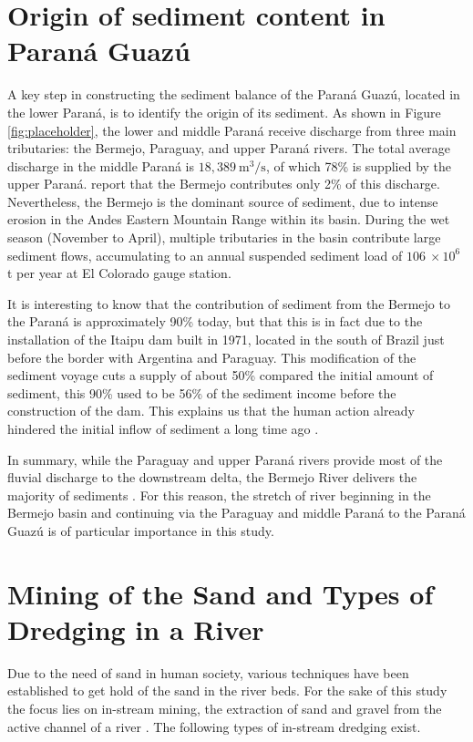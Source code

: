 \section{Origin of sediment content in Paraná Guazú}
\label{sec:origin sediment content}

A key step in constructing the sediment balance of the Paraná Guazú, located in the lower Paraná, is to identify the origin of its sediment. As shown in Figure \ref{fig:placeholder}, the lower and middle Paraná receive discharge from three main tributaries: the Bermejo, Paraguay, and upper Paraná rivers. The total average discharge in the middle Paraná is $18,389~\mathrm{m^3/s}$, of which 78\% is supplied by the upper Paraná. \citeauthor{lopezweibelSourcesTemporalDynamics2022} report that the Bermejo contributes only 2\% of this discharge. Nevertheless, the Bermejo is the dominant source of sediment, due to intense erosion in the Andes Eastern Mountain Range within its basin. During the wet season (November to April), multiple tributaries in the basin contribute large sediment flows, accumulating to an annual suspended sediment load of $106 ~\times 10^6$ t per year at El Colorado gauge station. 

It is interesting to know that the contribution of sediment from the Bermejo to the Paraná is approximately 90\% today, but that this is in fact due to the installation of the Itaipu dam built in 1971, located in the south of Brazil just before the border with Argentina and Paraguay. This modification of the sediment voyage cuts a supply of about 50\% compared the initial amount of sediment, this 90\% used to be 56\% of the sediment income before the construction of the dam. This explains us that the human action already hindered the initial inflow of sediment a long time ago \autocite{hibaParanaRiverEcological2024}.

In summary, while the Paraguay and upper Paraná rivers provide most of the fluvial discharge to the downstream delta, the Bermejo River delivers the majority of sediments \autocite{lopezweibelSourcesTemporalDynamics2022}. For this reason, the stretch of river beginning in the Bermejo basin and continuing via the Paraguay and middle Paraná to the Paraná Guazú is of particular importance in this study.  

\section{Mining of the Sand and Types of Dredging in a River}
Due to the need of sand in human society, various techniques have been established to get hold of the sand in the river beds. For the sake of this study the focus lies on in-stream mining, the extraction of sand and gravel from the active channel of a river \autocite{sand-mining-boek}. The following types of in-stream dredging exist.

